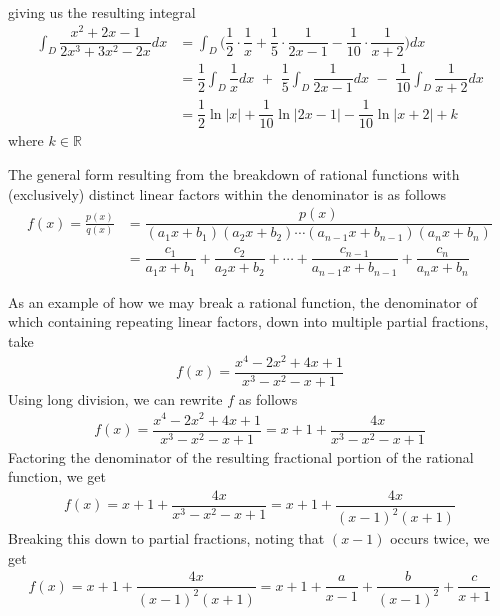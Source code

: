 \begin{example}
\begin{align*}
\end{align*}
giving us the resulting integral
\begin{align*}
    \int_{D} \dfrac{x^{2} + 2x - 1}{2x^{3} + 3x^{2} - 2x} dx &= \int_{D} \Big(\dfrac{1}{2} \cdot \dfrac{1}{x} + \dfrac{1}{5} \cdot \dfrac{1}{2x - 1} - \dfrac{1}{10} \cdot \dfrac{1}{x + 2}\Big) dx\\[2ex]
    &= \dfrac{1}{2}\int_{D} \dfrac{1}{x} dx \hspace{4pt} + \hspace{4pt} \dfrac{1}{5}\int_{D} \dfrac{1}{2x - 1} dx \hspace{4pt} - \hspace{4pt} \dfrac{1}{10}\int_{D} \dfrac{1}{x+2} dx\\[2ex]
    &= \dfrac{1}{2}\ln \lvert x \rvert + \dfrac{1}{10}\ln \lvert 2x - 1 \rvert - \dfrac{1}{10}\ln \lvert x + 2 \rvert + k
\end{align*}
where $k \in \mathbb{R}$
\end{example}

\begin{example}
The general form resulting from the breakdown of rational functions with (exclusively) distinct linear factors within the denominator is as follows
\begin{align*}
    f(x) = \frac{p(x)}{q(x)} &= \dfrac{p(x)}{(a_{1}x + b_{1})(a_{2}x + b_{2}) \cdots (a_{n-1}x + b_{n-1})(a_{n}x + b_{n})}\\[2ex]
    &= \dfrac{c_{1}}{a_{1}x + b_{1}} + \dfrac{c_{2}}{a_{2}x + b_{2}} + \cdots + \dfrac{c_{n-1}}{a_{n-1}x + b_{n-1}} + \dfrac{c_{n}}{a_{n}x + b_{n}}
\end{align*}
\end{example}

\begin{example}
As an example of how we may break a rational function, the denominator of which containing repeating linear factors, down into multiple partial fractions, take
\begin{align*}
    f(x) = \dfrac{x^{4} - 2x^{2} + 4x + 1}{x^{3} - x^{2} - x + 1}
\end{align*}
Using long division, we can rewrite $f$ as follows
\begin{align*}
    f(x) = \dfrac{x^{4} - 2x^{2} + 4x + 1}{x^{3} - x^{2} - x + 1} = x + 1 + \dfrac{4x}{x^{3} - x^{2} - x + 1}
\end{align*}
Factoring the denominator of the resulting fractional portion of the rational function, we get
\begin{align*}
    f(x) = x + 1 + \dfrac{4x}{x^{3} - x^{2} - x + 1} = x + 1 + \dfrac{4x}{(x-1)^{2} (x+1)}
\end{align*}
Breaking this down to partial fractions, noting that $(x-1)$ occurs twice, we get
\begin{align*}
    f(x) = x + 1 + \dfrac{4x}{(x-1)^{2} (x+1)} = x + 1 + \dfrac{a}{x - 1} + \dfrac{b}{(x - 1)^{2}} + \dfrac{c}{x + 1}
\end{align*}
\end{example}

